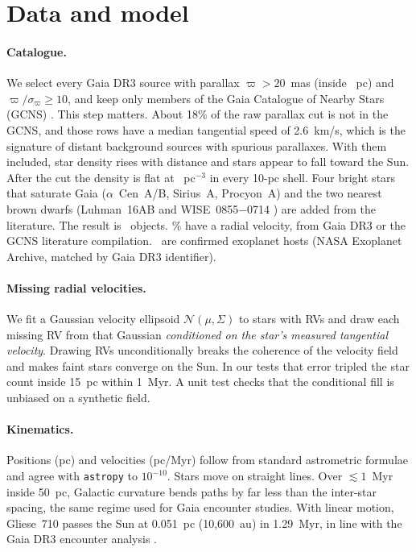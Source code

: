 \section{Data and model}
\label{sec:model}

\paragraph{Catalogue.} We select every Gaia DR3 source with parallax
$\varpi>20$~mas (inside \CatRadius~pc) and $\varpi/\sigma_\varpi\ge10$, and keep
only members of the Gaia Catalogue of Nearby Stars (GCNS)
\cite{smart2021gcns}. This step matters. About 18\% of the raw parallax cut is
not in the GCNS, and those rows have a median tangential speed of 2.6~km/s,
which is the signature of distant background sources with spurious parallaxes.
With them included, star density rises with distance and stars appear to fall
toward the Sun. After the cut the density is flat at \Density~pc$^{-3}$ in
every 10-pc shell. Four bright stars that saturate Gaia ($\alpha$~Cen~A/B,
Sirius~A, Procyon~A) and the two nearest brown dwarfs (Luhman~16AB
\cite{luhman2013discovery} and WISE~0855$-$0714 \cite{luhman2014discovery}) are
added from the literature. The result is \NStars\ objects. \PctRV\% have a
radial velocity, from Gaia DR3 or the GCNS literature compilation.
\NHosts\ are confirmed exoplanet hosts (NASA Exoplanet Archive, matched by
Gaia DR3 identifier).

\paragraph{Missing radial velocities.} We fit a Gaussian velocity ellipsoid
$\mathcal N(\mu,\Sigma)$ to stars with RVs and draw each missing RV from that
Gaussian \emph{conditioned on the star's measured tangential velocity}. Drawing
RVs unconditionally breaks the coherence of the velocity field and makes faint
stars converge on the Sun. In our tests that error tripled the star count
inside 15~pc within 1~Myr. A unit test checks that the conditional fill is
unbiased on a synthetic field.

\paragraph{Kinematics.} Positions (pc) and velocities (pc/Myr) follow from
standard astrometric formulae and agree with \texttt{astropy} to $10^{-10}$.
Stars move on straight lines. Over $\lesssim1$~Myr inside 50~pc, Galactic
curvature bends paths by far less than the inter-star spacing, the same regime
used for Gaia encounter studies. With linear motion, Gliese~710 passes
the Sun at 0.051~pc (10,600~au) in 1.29~Myr, in line with the Gaia DR3
encounter analysis \cite{bailerjones2022gl710}.

